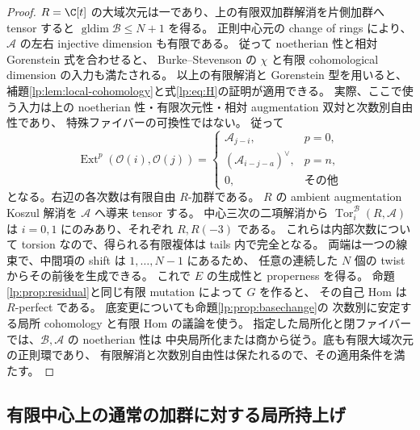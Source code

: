 \begin{proof}
$R=\C[t]$ の大域次元は一であり、上の有限双加群解消を片側加群へ tensor すると
$\operatorname{gldim}\mathscr B\leq N+1$ を得る。
正則中心元の change of rings により、$\mathscr A$ の左右 injective dimension も有限である。
従って noetherian 性と相対 Gorenstein 式を合わせると、
Burke--Stevenson の $\chi$ と有限 cohomological dimension の入力も満たされる。
以上の有限解消と Gorenstein 型を用いると、
補題\ref{lp:lem:local-cohomology}と式\eqref{lp:eq:H}の証明が適用できる。
実際、ここで使う入力は上の noetherian 性・有限次元性・相対 augmentation 双対と次数別自由性であり、
特殊ファイバーの可換性ではない。
従って
\[
 \operatorname{Ext}^p(\mathcal O(i),\mathcal O(j))=
 \begin{cases}
  \mathscr A_{j-i},&p=0,\\
  (\mathscr A_{i-j-a})^\vee,&p=n,\\
  0,&\text{その他}
 \end{cases}
\]
となる。右辺の各次数は有限自由 $R$-加群である。
$R$ の ambient augmentation Koszul 解消を $\mathscr A$ へ導来 tensor する。
中心三次の二項解消から $\operatorname{Tor}^{\mathscr B}_i(R,\mathscr A)$ は
$i=0,1$ にのみあり、それぞれ $R,R(-3)$ である。
これらは内部次数について torsion なので、得られる有限複体は tails 内で完全となる。
両端は一つの線束で、中間項の shift は $1,\ldots,N-1$ にあるため、
任意の連続した $N$ 個の twist からその前後を生成できる。
これで $E$ の生成性と properness を得る。
命題\ref{lp:prop:residual}と同じ有限 mutation によって $G$ を作ると、
その自己 Hom は $R$-perfect である。
底変更についても命題\ref{lp:prop:basechange}の
次数別に安定する局所 cohomology と有限 Hom の議論を使う。
指定した局所化と閉ファイバーでは、$\mathscr B,\mathscr A$ の noetherian 性は
中央局所化または商から従う。底も有限大域次元の正則環であり、
有限解消と次数別自由性は保たれるので、その適用条件を満たす。
\end{proof}

\subsection{有限中心上の通常の加群に対する局所持上げ}

